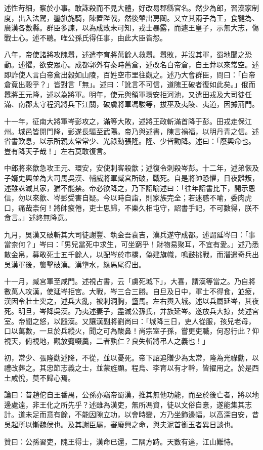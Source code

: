 \begin{pinyinscope}
述性苛細，察於小事。敢誅殺而不見大體，好改易郡縣官名。然少為郎，習漢家制度，出入法駕，鑾旗旄騎，陳置陛戟，然後輦出房闥。又立其兩子為王，食犍為、廣漢各數縣。群臣多諫，以為成敗未可知，戎士暴露，而遽王皇子，示無大志，傷戰士心。述不聽。唯公孫氏得任事，由此大臣皆怨。

八年，帝使諸將攻隗囂，述遣李育將萬餘人救囂。囂敗，并沒其軍，蜀地聞之恐動。述懼，欲安眾心。成都郭外有秦時舊倉，述改名白帝倉，自王莽以來常空。述即詐使人言白帝倉出穀如山陵，百姓空市里往觀之。述乃大會群臣，問曰：「白帝倉竟出穀乎？」皆對言「無」。述曰：「訛言不可信，道隗王破者復如此矣。」俄而囂將王元降，述以為將軍。明年，使元與領軍環安拒河池，又遣田戎及大司徒任滿、南郡太守程汎將兵下江關，破虜將軍馮駿等，拔巫及夷陵、夷道，因據荊門。

十一年，征南大將軍岑彭攻之，滿等大敗，述將王政斬滿首降于彭。田戎走保江州。城邑皆開門降，彭遂長驅至武陽。帝乃與述書，陳言禍福，以明丹青之信。述省書歎息，以示所親太常常少、光祿勳張隆。隆、少皆勸降。述曰：「廢興命也。豈有降天子哉！」左右莫敢復言。

中郎將來歙急攻王元、環安，安使刺客殺歙；述復令刺殺岑彭。十二年，述弟恢及子婿史興並為大司馬吳漢、輔威將軍臧宮所破，戰死。自是將帥恐懼，日夜離叛，述雖誅滅其家，猶不能禁。帝必欲降之，乃下詔喻述曰：「往年詔書比下，開示恩信，勿以來歙、岑彭受害自疑。今以時自詣，則家族完全；若迷惑不喻，委肉虎口，痛哉柰何！將帥疲倦，吏士思歸，不樂久相屯守，詔書手記，不可數得，朕不食言。」述終無降意。

九月，吳漢又破斬其大司徒謝豐、執金吾袁吉，漢兵遂守成都。述謂延岑曰：「事當柰何？」岑曰：「男兒當死中求生，可坐窮乎！財物易聚耳，不宜有愛。」述乃悉散金帛，募敢死士五千餘人，以配岑於市橋，偽建旗幟，鳴鼓挑戰，而潛遣奇兵出吳漢軍後，襲擊破漢。漢墯水，緣馬尾得出。

十一月，臧宮軍至咸門。述視占書，云「虜死城下」，大喜，謂漢等當之。乃自將數萬人攻漢，使延岑拒宮。大戰，岑三合三勝。自旦及日中，軍士不得食，並疲，漢因令壯士突之，述兵大亂，被刺洞胸，墯馬。左右輿入城。述以兵屬延岑，其夜死。明旦，岑降吳漢。乃夷述妻子，盡滅公孫氏，并族延岑。遂放兵大掠，焚述宮室。帝聞之怒，以譴漢。又讓漢副將劉尚曰：「城降三日，吏人從服，孩兒老母，口以萬數，一旦於兵縱火，聞之可為酸鼻！尚宗室子孫，嘗更吏職，何忍行此？仰視天，俯視地，觀放麑啜羹，二者孰仁？良失斬將弔人之義也！」

初，常少、張隆勸述降，不從，並以憂死。帝下詔追贈少為太常，隆為光祿勳，以禮改葬之。其忠節志義之士，並蒙旌顯。程烏、李育以有才幹，皆擢用之。於是西土咸悅，莫不歸心焉。

論曰：昔趙佗自王番禺，公孫亦竊帝蜀漢，推其無他功能，而至於後亡者，將以地邊處遠，非王化之所先乎？述雖為漢吏，無所馮資，徒以文俗自憙，遂能集其志計。道未足而意有餘，不能因隙立功，以會時變，方乃坐飾邊幅，以高深自安，昔吳起所以慚魏侯也。及其謝臣屬，審廢興之命，與夫泥首銜玉者異日談也。

贊曰：公孫習吏，隗王得士，漢命已還，二隅方跱。天數有違，江山難恃。


\end{pinyinscope}